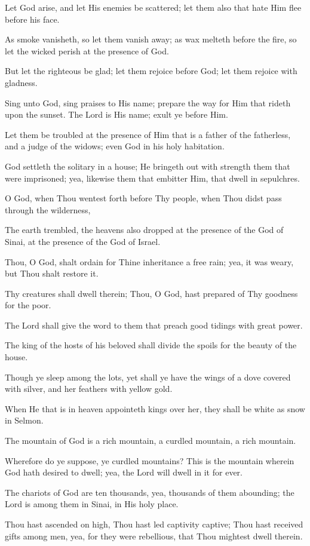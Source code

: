 Let God arise, and let His enemies be scattered; let them also that hate Him flee before his face.

As smoke vanisheth, so let them vanish away; as wax melteth before the fire, so let the wicked perish at the presence of God.

But let the righteous be glad; let them rejoice before God; let them rejoice with gladness.

Sing unto God, sing praises to His name; prepare the way for Him that rideth upon the sunset. The Lord is His name; exult ye
before Him.

Let them be troubled at the presence of Him that is a father of the fatherless, and a judge of the widows; even God in his holy habitation.

God settleth the solitary in a house; He bringeth out with strength them that were imprisoned; yea, likewise them that embitter Him, that dwell in sepulchres.

O God, when Thou wentest forth before Thy people, when Thou didst pass through the wilderness,

The earth trembled, the heavens also dropped at the presence of the God of Sinai, at the presence of the God of Israel.

Thou, O God, shalt ordain for Thine inheritance a free rain; yea, it was weary, but Thou shalt restore it.

Thy creatures shall dwell therein; Thou, O God, hast prepared of Thy goodness for the poor.

The Lord shall give the word to them that preach good tidings with great power.

The king of the hosts of his beloved shall divide the spoils for the beauty of the house.

Though ye sleep among the lots, yet shall ye have the wings of a dove covered with silver, and her feathers with yellow gold.

When He that is in heaven appointeth kings over her, they shall be white as snow in Selmon.

The mountain of God is a rich mountain, a curdled mountain, a rich mountain.

Wherefore do ye suppose, ye curdled mountains? This is the mountain wherein God hath desired to dwell; yea, the Lord will dwell in it for ever.

The chariots of God are ten thousands, yea, thousands of them abounding; the Lord is among them in Sinai, in His holy place.

Thou hast ascended on high, Thou hast led captivity captive; Thou hast received gifts among men, yea, for they were rebellious, that Thou mightest dwell therein.

